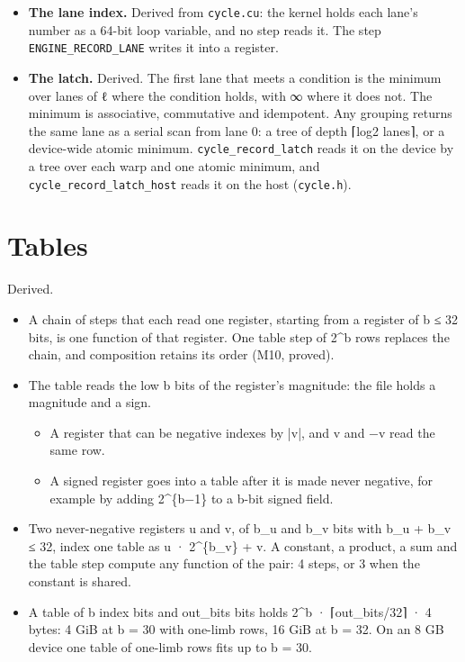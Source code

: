 \begin{itemize}
\item \textbf{The lane index.} Derived from \texttt{cycle.\allowbreak{}cu}: the kernel holds each lane's number as a 64-bit loop variable, and no step reads it. The step \texttt{ENGINE\_\allowbreak{}RECORD\_\allowbreak{}LANE} writes it into a register.
\item \textbf{The latch.} Derived. The first lane that meets a condition is the minimum over lanes of ℓ where the condition holds, with ∞ where it does not. The minimum is associative, commutative and idempotent. Any grouping returns the same lane as a serial scan from lane 0: a tree of depth ⌈log2 lanes⌉, or a device-wide atomic minimum. \texttt{cycle\_\allowbreak{}record\_\allowbreak{}latch} reads it on the device by a tree over each warp and one atomic minimum, and \texttt{cycle\_\allowbreak{}record\_\allowbreak{}latch\_\allowbreak{}host} reads it on the host (\texttt{cycle.\allowbreak{}h}).
\end{itemize}

\section{\texorpdfstring{Tables}{Tables}}

Derived.

\begin{itemize}
\item A chain of steps that each read one register, starting from a register of b ≤ 32 bits, is one function of that register. One table step of 2\textasciicircum{}b rows replaces the chain, and composition retains its order (M10, proved).
\item The table reads the low b bits of the register's magnitude: the file holds a magnitude and a sign.

\begin{itemize}
\item A register that can be negative indexes by |v|, and v and −v read the same row.
\item A signed register goes into a table after it is made never negative, for example by adding 2\textasciicircum{}\{b−1\} to a b-bit signed field.
\end{itemize}
\item Two never-negative registers u and v, of b\_\allowbreak{}u and b\_\allowbreak{}v bits with b\_\allowbreak{}u + b\_\allowbreak{}v ≤ 32, index one table as u · 2\textasciicircum{}\{b\_\allowbreak{}v\} + v. A constant, a product, a sum and the table step compute any function of the pair: 4 steps, or 3 when the constant is shared.
\item A table of b index bits and out\_\allowbreak{}bits bits holds 2\textasciicircum{}b · ⌈out\_\allowbreak{}bits/32⌉ · 4 bytes: 4 GiB at b = 30 with one-limb rows, 16 GiB at b = 32. On an 8 GB device one table of one-limb rows fits up to b = 30.
\end{itemize}


